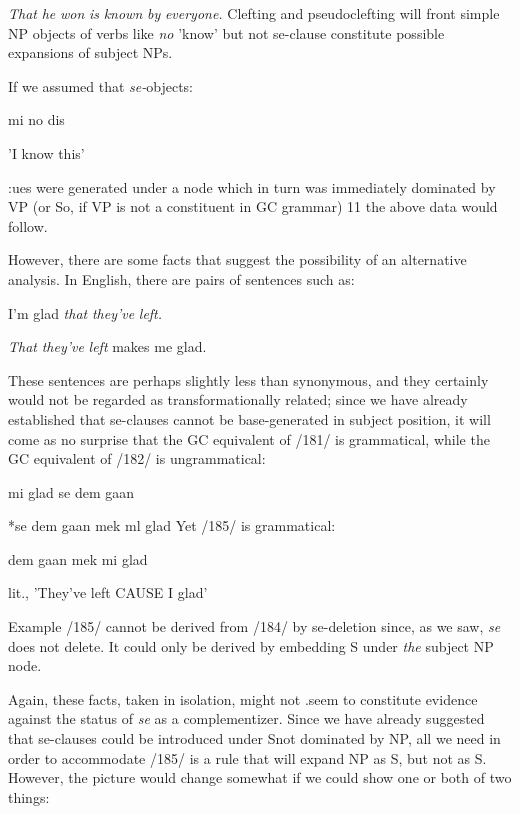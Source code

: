 \textit{That} \textit{he} \textit{won} \textit{is} \textit{k}\textit{nown} \textit{by} \textit{everyone.} Clefting and pseudoclefting will
front simple NP objects of verbs like \textit{no }'know' but not se-clause 
constitute possible expansions of subject NPs.

If we assumed that \textit{se-}objects:

\ea\label{ex:169}
 mi no dis
\glt
\z

'I know this'

:ues were generated under a node which in turn was immediately
dominated by VP (or So, if VP is not a constituent in GC grammar) 11 the above data would follow.

However, there are some facts that suggest the possibility of
an alternative analysis. In English, there are pairs of sentences such as:

\ea\label{ex:181}
 I'm glad \textit{that} \textit{they've} \textit{left.}
\glt
\z

\ea\label{ex:182}
 \textit{That} \textit{they've} \textit{left} makes me glad.
\glt
\z

These sentences are perhaps slightly less than synonymous, and they certainly would not be regarded as transformationally related; since we have already established that se-clauses cannot be base-generated in subject position, it will come as no surprise that the GC equiva\-lent of /181/ is grammatical, while the GC equivalent of /182/ is ungrammatical:

\ea\label{ex:183}
 mi glad se dem gaan
\glt
\z

\ea\label{ex:184}
 *se dem gaan mek ml glad Yet /185/ is grammatical:
\glt
\z

\ea\label{ex:185}
 dem gaan mek mi glad
\glt
\z

lit., 'They've left CAUSE I glad'

Example /185/ cannot be derived from /184/ by se-deletion since, as we saw, \textit{se} does not delete. It could only be derived by embedding S under \textit{the} subject NP node.

Again, these facts, taken in isolation, might not .seem to con\-stitute evidence against the status of \textit{se} as a complementizer. Since we have already suggested that se-clauses could be introduced under Snot dominated by NP, all we need in order to accommodate /185/ is a rule that will expand NP as S, but not as S. However, the picture would change somewhat if we could show one or both of two things:



